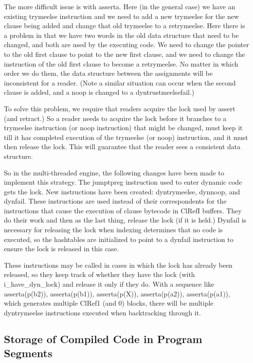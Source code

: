 \documentclass[11pt]{article}
\begin{document}
The more difficult issue is with asserta.  Here (in the general case)
we have an existing trymeelse instruction and we need to add a new
trymeelse for the new clause being added and change that old trymeelse
to a retrymeelse.  Here there is a problem in that we have two words
in the old data structure that need to be changed, and both are used
by the executing code.  We need to change the pointer to the old first
clause to point to the new first clause, and we need to change the
instruction of the old first clause to become a retrymeelse.  No
matter in which order we do them, the data structure between the
assignments will be inconsistent for a reader.  (Note a similar
situation can occur when the second clause is added, and a noop is
changed to a dyntrustmeelsefail.)

To solve this problem, we require that readers acquire the lock used
by assert (and retract.)  So a reader needs to acquire the lock before
it branches to a trymeelse instruction (or noop instruction) that
might be changed, must keep it till it has completed execution of the
trymeelse (or noop) instruction, and it must then release the lock.
This will guarantee that the reader sees a consistent data structure.

So in the multi-threaded engine, the following changes have been made
to implement this strategy.  The jumptpreg instruction used to enter
dynamic code gets the lock.  New instructions have been created:
dyntrymeelse, dynnoop, and dynfail.  These instructions are used
instead of their correspondents for the instructions that cause the
execution of clause bytecode in ClRefI buffers.  They do their work
and then as the last thing, release the lock (if it is held.)  Dynfail
is necessary for releasing the lock when indexing determines that no
code is executed, so the hashtables are initialized to point to a
dynfail instruction to ensure the lock is released in this case.

These instructions may be called in cases in which the lock has
already been released, so they keep track of whether they have the
lock (with i\_have\_dyn\_lock) and release it only if they do.  With a
sequence like asserta(p(b2)), asserta(p(b1)), asserta(p(X)),
asserta(p(a2)), asserta(p(a1)), which generates multiple ClRef1 (and
0) blocks, there will be multiple dyntrymeelse instructions executed
when backtracking through it.

\subsection{Storage of Compiled Code in Program Segments}
\end{document}

